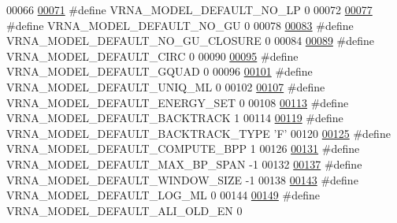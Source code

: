 \begin{DoxyCode}
00066 
\hyperlink{group__model__details_gab72462726dd60ed0d43339bbf7ee08ad}{00071} \textcolor{preprocessor}{#define VRNA\_MODEL\_DEFAULT\_NO\_LP          0}
00072 
\hyperlink{group__model__details_ga34702f7d14d38b877ba8e475281e97e2}{00077} \textcolor{preprocessor}{#define VRNA\_MODEL\_DEFAULT\_NO\_GU          0}
00078 
\hyperlink{group__model__details_ga5308de46faaca4b9fd16045864901ee7}{00083} \textcolor{preprocessor}{#define VRNA\_MODEL\_DEFAULT\_NO\_GU\_CLOSURE  0}
00084 
\hyperlink{group__model__details_ga22059033db7bcd875c51fec32425490a}{00089} \textcolor{preprocessor}{#define VRNA\_MODEL\_DEFAULT\_CIRC           0}
00090 
\hyperlink{group__model__details_ga793ed812e86f43799b14b2deee917f23}{00095} \textcolor{preprocessor}{#define VRNA\_MODEL\_DEFAULT\_GQUAD          0}
00096 
\hyperlink{group__model__details_ga63f6006a02ba2d89148441f406c309e7}{00101} \textcolor{preprocessor}{#define VRNA\_MODEL\_DEFAULT\_UNIQ\_ML        0}
00102 
\hyperlink{group__model__details_ga6fcf6b2d0f89256cdbd166486c9b6e1e}{00107} \textcolor{preprocessor}{#define VRNA\_MODEL\_DEFAULT\_ENERGY\_SET     0}
00108 
\hyperlink{group__model__details_ga3fda8006ab84baf817bd8e5ccbc6bb35}{00113} \textcolor{preprocessor}{#define VRNA\_MODEL\_DEFAULT\_BACKTRACK      1}
00114 
\hyperlink{group__model__details_gad0e81fcaca53c4a826c68e0796de2afb}{00119} \textcolor{preprocessor}{#define VRNA\_MODEL\_DEFAULT\_BACKTRACK\_TYPE 'F'}
00120 
\hyperlink{group__model__details_ga1d6cd5051940b126c248147c011bac6c}{00125} \textcolor{preprocessor}{#define VRNA\_MODEL\_DEFAULT\_COMPUTE\_BPP    1}
00126 
\hyperlink{group__model__details_ga7cb6f4ae8fdebff6746a4410814f2977}{00131} \textcolor{preprocessor}{#define VRNA\_MODEL\_DEFAULT\_MAX\_BP\_SPAN    -1}
00132 
\hyperlink{group__model__details_ga8de04a9cb57e811e313b0f9f207f6bdb}{00137} \textcolor{preprocessor}{#define VRNA\_MODEL\_DEFAULT\_WINDOW\_SIZE    -1}
00138 
\hyperlink{group__model__details_ga938f68463e84fe060aa6502f428a517d}{00143} \textcolor{preprocessor}{#define VRNA\_MODEL\_DEFAULT\_LOG\_ML         0}
00144 
\hyperlink{group__model__details_ga2a5bbfc1edf33077e39466d2d9807115}{00149} \textcolor{preprocessor}{#define VRNA\_MODEL\_DEFAULT\_ALI\_OLD\_EN     0}

\end{DoxyCode}
